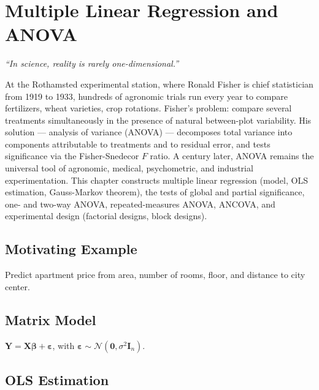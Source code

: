 \chapter{Multiple Linear Regression and ANOVA}
\label{ch:multiple-regression}

\begin{center}
\textit{``In science, reality is rarely one-dimensional.''}
\end{center}

At the Rothamsted experimental station, where Ronald Fisher is chief statistician from 1919 to 1933, hundreds of agronomic trials run every year to compare fertilizers, wheat varieties, crop rotations. Fisher's problem: compare several treatments simultaneously in the presence of natural between-plot variability. His solution --- analysis of variance (ANOVA) --- decomposes total variance into components attributable to treatments and to residual error, and tests significance via the Fisher-Snedecor $F$ ratio. A century later, ANOVA remains the universal tool of agronomic, medical, psychometric, and industrial experimentation. This chapter constructs multiple linear regression (model, OLS estimation, Gauss-Markov theorem), the tests of global and partial significance, one- and two-way ANOVA, repeated-measures ANOVA, ANCOVA, and experimental design (factorial designs, block designs).

\section{Motivating Example}
Predict apartment price from area, number of rooms, floor, and distance to city center.

\section{Matrix Model}

\begin{definition}
$\mathbf{Y} = \mathbf{X}\bm{\beta} + \bm{\varepsilon}$, with $\bm{\varepsilon}\sim\mathcal{N}(\mathbf{0},\sigma^2\mathbf{I}_n)$.
\end{definition}

\section{OLS Estimation}

